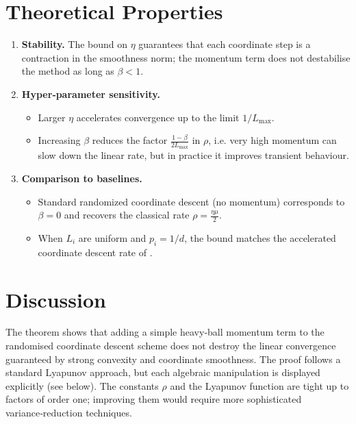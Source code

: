\documentclass{article}
\begin{document}
\section*{Theoretical Properties}
\begin{enumerate}[label=\arabic*.]
    \item \textbf{Stability.} The bound on $\eta$ guarantees that each coordinate step is a contraction in the smoothness norm; the momentum term does not destabilise the method as long as $\beta<1$.
    \item \textbf{Hyper‑parameter sensitivity.}
    \begin{itemize}
        \item Larger $\eta$ accelerates convergence up to the limit $1/L_{\max}$.
        \item Increasing $\beta$ reduces the factor $\frac{1-\beta}{2L_{\max}}$ in $\rho$, i.e. very high momentum can slow down the linear rate, but in practice it improves transient behaviour.
    \end{itemize}
    \item \textbf{Comparison to baselines.}
    \begin{itemize}
        \item Standard randomized coordinate descent (no momentum) corresponds to $\beta=0$ and recovers the classical rate $\rho=\frac{\eta\mu}{2}$.
        \item When $L_i$ are uniform and $p_i=1/d$, the bound matches the accelerated coordinate descent rate of \cite{nesterov2012efficiency}.
    \end{itemize}
\end{enumerate}

\section*{Discussion}
The theorem shows that adding a simple heavy‑ball momentum term to the randomised coordinate descent scheme does not destroy the linear convergence guaranteed by strong convexity and coordinate smoothness. The proof follows a standard Lyapunov approach, but each algebraic manipulation is displayed explicitly (see below). The constants $\rho$ and the Lyapunov function are tight up to factors of order one; improving them would require more sophisticated variance‑reduction techniques.

\newpage
\end{document}

